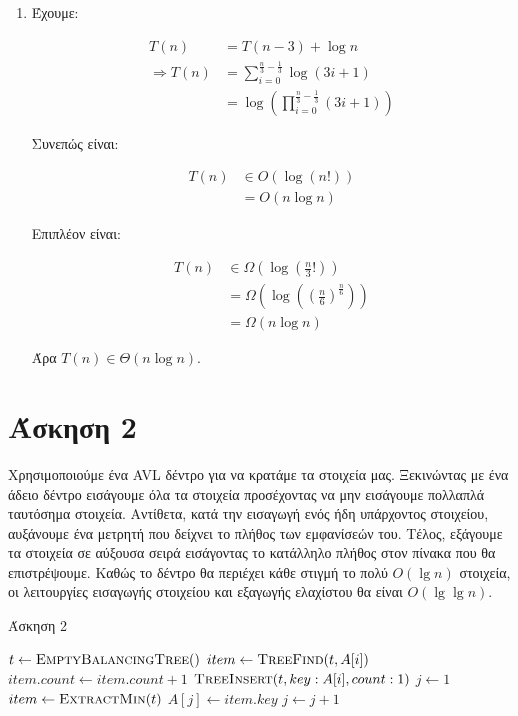 \documentclass[11pt,a4paper]{book}
\begin{document}
\begin{enumerate}
\item Έχουμε:

\begin{align*}
            T( n ) &= T( n - 3 ) + \log n \\
\Rightarrow T( n ) &= \sum_{i = 0}^{\frac{n}{3} - \frac{1}{3}} \log( 3i + 1 )\\
                   &= \log\left( \prod_{i = 0}^{\frac{n}{3} - \frac{1}{3}} (3i + 1) \right)
\end{align*}

Συνεπώς είναι:

\begin{align*}
T( n ) &\in O( \log( n! ) )\\
       &=   O( n \log n )
\end{align*}

Επιπλέον είναι:

\begin{align*}
T( n ) &\in \Omega\left( \log( \frac{n}{3}! ) \right) \\
         &= \Omega\left( \log \left(\left( \frac{n}{6} \right)^{\frac{n}{6}}\right) \right) \\
         &= \Omega( n \log n )
\end{align*}

Άρα $T( n ) \in \Theta( n \log n )$.
\end{enumerate}

\section*{Άσκηση 2}
Χρησιμοποιούμε ένα \textlatin{AVL} δέντρο για να κρατάμε τα στοιχεία μας. Ξεκινώντας με ένα άδειο δέντρο εισάγουμε όλα τα στοιχεία προσέχοντας να μην εισάγουμε πολλαπλά ταυτόσημα στοιχεία. Αντίθετα, κατά την εισαγωγή ενός ήδη υπάρχοντος στοιχείου, αυξάνουμε ένα μετρητή που δείχνει το πλήθος των εμφανίσεών του. Τέλος, εξάγουμε τα στοιχεία σε αύξουσα σειρά εισάγοντας το κατάλληλο πλήθος στον πίνακα που θα επιστρέψουμε. Καθώς το δέντρο θα περιέχει κάθε στιγμή το πολύ $O(\lg n)$ στοιχεία, οι λειτουργίες εισαγωγής στοιχείου και εξαγωγής ελαχίστου θα είναι $O( \lg \lg n )$.

\begin{algorithm}[H]
\caption{\textgreek{Άσκηση 2}}
\begin{algorithmic}[1]
    \State $t \gets \Call{EmptyBalancingTree}$
        \State $item \gets \Call{TreeFind}{t, A[ i ]}$
            \State $item.count \gets item.count + 1$
        \Else
            \State $\Call{TreeInsert}{t, key: A[ i ], count: 1}$
        \EndIf
    \EndFor
    \State $j \gets 1$
        \State $item \gets \Call{ExtractMin}{t}$
            \State $A[ j ] \gets item.key$
            \State $j \gets j + 1$
        \EndFor
    \EndWhile
\EndProcedure
\end{algorithmic}
\end{algorithm}
\end{document}
